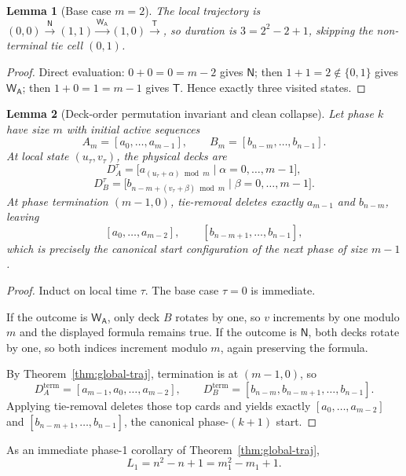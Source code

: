 \documentclass[11pt]{article}
\newtheorem{lemma}{Lemma}
\theoremstyle{definition}
\theoremstyle{remark}
\newcommand{\WA}{\mathsf{W_A}}
\newcommand{\TT}{\mathsf{T}}
\newcommand{\NN}{\mathsf{N}}
\begin{document}
\begin{lemma}[Base case $m=2$]\label{lem:base-m2}
The local trajectory is
$(0,0)\xrightarrow{\NN}(1,1)\xrightarrow{\WA}(1,0)\xrightarrow{\TT}$,
so duration is $3=2^2-2+1$, skipping the non-terminal tie cell $(0,1)$.
\end{lemma}
\begin{proof}
Direct evaluation: $0+0=0=m-2$ gives $\NN$; then $1+1=2\notin\{0,1\}$ gives $\WA$; then $1+0=1=m-1$ gives $\TT$.
Hence exactly three visited states.
\end{proof}

\begin{lemma}[Deck-order permutation invariant and clean collapse]\label{lem:handoff}
Let phase $k$ have size $m$ with initial active sequences
\[
A_m=[a_0,\dots,a_{m-1}],\qquad B_m=[b_{n-m},\dots,b_{n-1}].
\]
At local state $(u_\tau,v_\tau)$, the physical decks are
\[
D_A^\tau=\bigl[a_{(u_\tau+\alpha)\bmod m}\mid \alpha=0,\dots,m-1\bigr],
\]
\[
D_B^\tau=\bigl[b_{n-m+(v_\tau+\beta)\bmod m}\mid \beta=0,\dots,m-1\bigr].
\]
At phase termination $(m-1,0)$, tie-removal deletes exactly $a_{m-1}$ and $b_{n-m}$, leaving
\[
[a_0,\dots,a_{m-2}],\qquad [b_{n-m+1},\dots,b_{n-1}],
\]
which is precisely the canonical start configuration of the next phase of size $m-1$.
\end{lemma}
\begin{proof}
Induct on local time $\tau$. The base case $\tau=0$ is immediate.

If the outcome is $\WA$, only deck $B$ rotates by one, so $v$ increments by one modulo $m$ and the displayed
formula remains true. If the outcome is $\NN$, both decks rotate by one, so both indices increment modulo $m$,
again preserving the formula.

By Theorem~\ref{thm:global-traj}, termination is at $(m-1,0)$, so
\[
D_A^{\mathrm{term}}=[a_{m-1},a_0,\dots,a_{m-2}],\qquad
D_B^{\mathrm{term}}=[b_{n-m},b_{n-m+1},\dots,b_{n-1}].
\]
Applying tie-removal deletes those top cards and yields exactly
$[a_0,\dots,a_{m-2}]$ and $[b_{n-m+1},\dots,b_{n-1}]$, the canonical phase-$(k+1)$ start.
\end{proof}

As an immediate phase-1 corollary of Theorem~\ref{thm:global-traj},
\begin{equation}\label{eq:L1}
L_1=n^2-n+1=m_1^2-m_1+1.
\end{equation}
\end{document}

